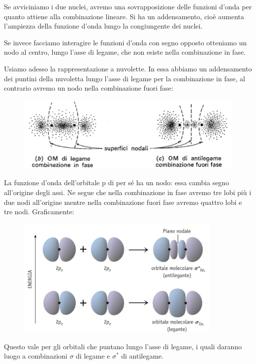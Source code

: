 \vspace{0.2cm}Se avviciniamo i due nuclei, avremo una sovrapposizione delle funzioni d'onda per quanto attiene alla combinazione lineare. Si ha un addensamento, cioè aumenta l'ampiezza della funzione d'onda lungo la congiungente dei nuclei.

Se invece facciamo interagire le funzioni d'onda con segno opposto otteniamo un nodo al centro, lungo l'asse di legame, che non esiste nella combinazione in fase.

\vspace{0.2cm}Usiamo adesso la rappresentazione a nuvolette. In essa abbiamo un addensamento dei puntini della nuvoletta lungo l'asse di legame per la combinazione in fase, al contrario avremo un nodo nella combinazione fuori fase:
\newpage
\begin{figure}[htp]
    \centering
    \includegraphics[width=12cm]{immagini/orbitali_molecolari_pigreco_nuvoletta.png}
\end{figure}

La funzione d'onda dell'orbitale p di per sé ha un nodo: essa cambia segno all'origine degli assi. Ne segue che nella combinazione in fase avremo tre lobi più i due nodi all'origine mentre nella combinazione fuori fase avremo quattro lobi e tre nodi. Graficamente:

\begin{figure}[htp]
    \centering
    \includegraphics[width=10cm]{immagini/orbitali_sigma_p.png}
\end{figure}

Questo vale per gli orbitali che puntano lungo l'asse di legame, i quali daranno luogo a combinazioni $\sigma$ di legame e $\sigma^*$ di antilegame.

